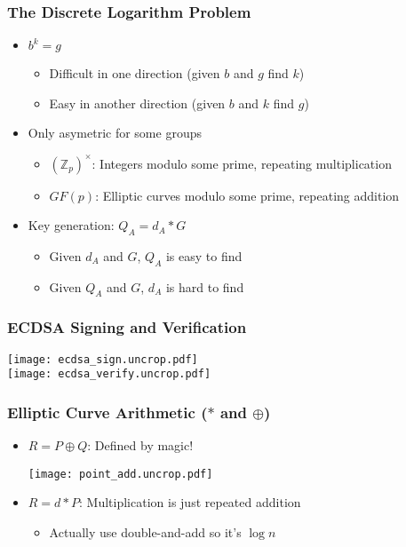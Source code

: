 \documentclass{beamer}
\begin{document}
\begin{frame}
  \frametitle{The Discrete Logarithm Problem}

  \begin{itemize}
  \item $b^k = g$
    \begin{itemize}
    \item Difficult in one direction (given $b$ and $g$ find $k$)
    \item Easy in another direction (given $b$ and $k$ find $g$)
    \end{itemize}
  \item Only asymetric for some groups
    \begin{itemize}
    \item $({\mathbb Z}_p)^\times$: Integers modulo some prime,
      repeating multiplication
    \item $GF(p)$: Elliptic curves modulo some prime, repeating
      addition
    \end{itemize}
  \item Key generation: $Q_A = d_A * G$
    \begin{itemize}
    \item Given $d_A$ and $G$, $Q_A$ is easy to find
    \item Given $Q_A$ and $G$, $d_A$ is hard to find
    \end{itemize}
  \end{itemize}
\end{frame}

\begin{frame}
  \frametitle{ECDSA Signing and Verification}

  \begin{center}
    \begin{multicols}{2}
      \texttt{[image: ecdsa\_sign.uncrop.pdf]} \\
      \texttt{[image: ecdsa\_verify.uncrop.pdf]} \\
    \end{multicols}
  \end{center}
\end{frame}

\begin{frame}
  \frametitle{Elliptic Curve Arithmetic ($*$ and $\oplus$)}

  \begin{itemize}
  \item $R = P\oplus Q$: Defined by magic!
    \begin{center}
      \texttt{[image: point\_add.uncrop.pdf]}
    \end{center}
  \item $R = d*P$: Multiplication is just repeated addition
    \begin{itemize}
    \item Actually use double-and-add so it's $\log n$
    \end{itemize}
  \end{itemize}
\end{frame}
\end{document}
